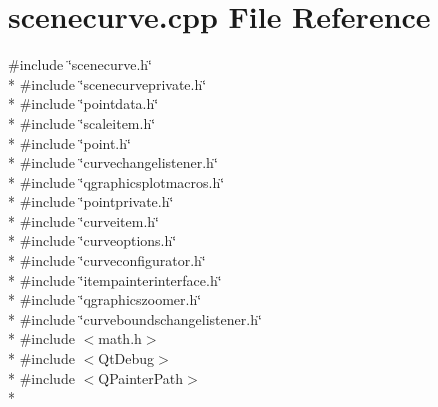 \section{scenecurve.\+cpp File Reference}
\label{bk3_2curve_2scenecurve_8cpp}
{\ttfamily \#include \char`\"{}scenecurve.\+h\char`\"{}}\\*
{\ttfamily \#include \char`\"{}scenecurveprivate.\+h\char`\"{}}\\*
{\ttfamily \#include \char`\"{}pointdata.\+h\char`\"{}}\\*
{\ttfamily \#include \char`\"{}scaleitem.\+h\char`\"{}}\\*
{\ttfamily \#include \char`\"{}point.\+h\char`\"{}}\\*
{\ttfamily \#include \char`\"{}curvechangelistener.\+h\char`\"{}}\\*
{\ttfamily \#include \char`\"{}qgraphicsplotmacros.\+h\char`\"{}}\\*
{\ttfamily \#include \char`\"{}pointprivate.\+h\char`\"{}}\\*
{\ttfamily \#include \char`\"{}curveitem.\+h\char`\"{}}\\*
{\ttfamily \#include \char`\"{}curveoptions.\+h\char`\"{}}\\*
{\ttfamily \#include \char`\"{}curveconfigurator.\+h\char`\"{}}\\*
{\ttfamily \#include \char`\"{}itempainterinterface.\+h\char`\"{}}\\*
{\ttfamily \#include \char`\"{}qgraphicszoomer.\+h\char`\"{}}\\*
{\ttfamily \#include \char`\"{}curveboundschangelistener.\+h\char`\"{}}\\*
{\ttfamily \#include $<$math.\+h$>$}\\*
{\ttfamily \#include $<$Qt\+Debug$>$}\\*
{\ttfamily \#include $<$Q\+Painter\+Path$>$}\\*
